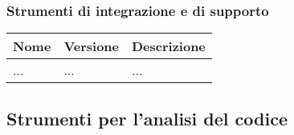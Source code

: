 \subsubsection{Strumenti di integrazione e di supporto}
\begin{table}[h!]
    \centering
    \renewcommand{\arraystretch}{1.6} %
    \begin{tabularx}{\textwidth}{|p{2cm}|p{2cm}|X|} \hline
    \rowcolor[HTML]{FFD700} 
    \textbf{Nome} & \textbf{Versione} & \textbf{Descrizione} \\ \hline
    ... & ... & ... \\ \hline
    \end{tabularx}
\end{table}

\newpage

\subsection{Strumenti per l’analisi del codice}

